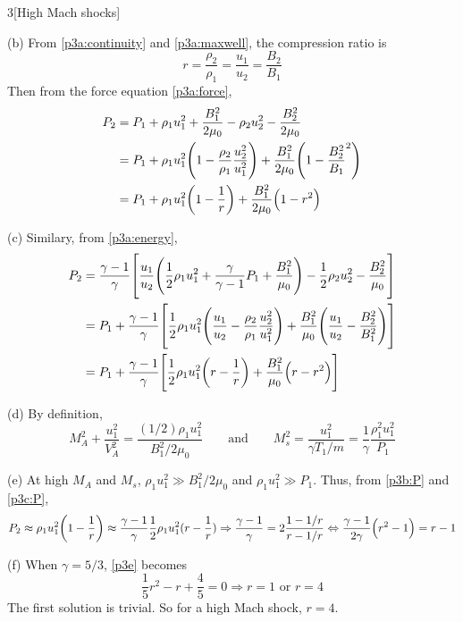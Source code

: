 \documentclass[12pt]{article}
\begin{document}
\begin{problem}{3}[High Mach shocks]
\begin{solution}
(b) From \eqref{p3a:continuity} and \eqref{p3a:maxwell}, the compression ratio
is
\begin{equation}
    r=\frac{\rho_2}{\rho_1}=\frac{u_1}{u_2}=\frac{B_2}{B_1} 
\end{equation}
Then from the force equation \eqref{p3a:force},
\begin{align}\label{p3b:P}
    P_2&=P_1+\rho_1u_1^2+\frac{B_1^2}{2\mu_0}-\rho_2u_2^2-\frac{B_2^2}{2\mu_0}\notag\\
       &=P_1+\rho_1u_1^2\qty(1-\frac{\rho_2}{\rho_1}\frac{u_2^2}{u_1^2})
   +\frac{B_1^2}{2\mu_0}\qty(1-\frac{B_2^2}{B_1}^2)\notag\\
       &=P_1+\rho_1u_1^2\qty(1-\frac1r)+\frac{B_1^2}{2\mu_0}\qty(1-r^2)
\end{align}

(c) Similary, from \eqref{p3a:energy},
\begin{align}\label{p3c:P}
    P_2&=\frac{\gamma-1}{\gamma}\qty[\frac{u_1}{u_2}\qty(\frac12\rho_1u_1^2+\frac{\gamma}{\gamma-1}P_1+\frac{B_1^2}{\mu_0})-\frac12\rho_2u_2^2-\frac{B_2^2}{\mu_0}]\notag\\
       &=P_1+\frac{\gamma-1}{\gamma}\qty[
       \frac12\rho_1u_1^2\qty(\frac{u_1}{u_2}-\frac{\rho_2}{\rho_1}\frac{u_2^2}{u_1^2})+\frac{B_1^2}{\mu_0}\qty(\frac{u_1}{u_2}-\frac{B_2^2}{B_1^2})
       ]\notag\\
       &=P_1+\frac{\gamma-1}{\gamma}\qty[
            \frac12\rho_1u_1^2\qty(r-\frac1r)+\frac{B_1^2}{\mu_0}\qty(r-r^2)
       ]
\end{align}

(d) By definition,
\begin{equation}
    M_A^2+\frac{u_1^2}{V_A^2}=\frac{(1/2)\rho_1u_1^2}{B_1^2/2\mu_0}
    \qquad\text{and}\qquad
    M_s^2=\frac{u_1^2}{\gamma T_1/m}
    =\frac{1}{\gamma}\frac{\rho_1^2u_1^2}{P_1}
\end{equation}

(e) At high $M_A$ and $M_s$, $\rho_1u_1^2\gg B_1^2/2\mu_0$ and $\rho_1 u_1^2\gg
P_1$. Thus, from \eqref{p3b:P} and \eqref{p3c:P},
\begin{equation}\label{p3e}
    P_2\approx\rho_1u_1^2\qty(1-\frac1r)\approx\frac{\gamma-1}{\gamma}\frac12\rho_1u_1^2(r-\frac1r)\Rightarrow\frac{\gamma-1}{\gamma}=2\frac{1-1/r}{r-1/r}\Leftrightarrow
    \frac{\gamma-1}{2\gamma}\qty(r^2-1)=r-1
\end{equation}

(f) When $\gamma=5/3$, \eqref{p3e} becomes
\begin{equation}
    \frac15r^2-r+\frac45=0\Rightarrow r=1\text{ or }r=4
\end{equation}
The first solution is trivial. So for a high Mach shock, $r=4$.
\end{solution}
\end{problem}
\end{document}
